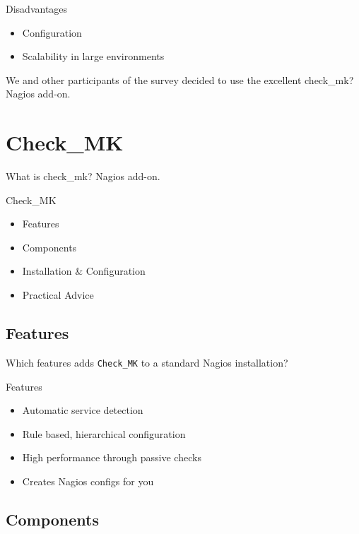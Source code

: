\begin{frame}{Disadvantages}

\begin{itemize}
\item Configuration
\item Scalability in large environments
\end{itemize}
\end{frame}

We and other participants of the survey decided to use the excellent 
check\_mk? Nagios add-on.

\section{Check\_MK}

What is check\_mk? Nagios add-on.

\begin{frame}[fragile]{Check\_MK}
\begin{itemize}
\item Features
\item Components
\item Installation \& Configuration
\item Practical Advice
\end{itemize}
\end{frame}

\subsection{Features}

Which features adds \verb|Check_MK| to a standard Nagios installation?

\begin{frame}[fragile]{Features}
\begin{itemize}
\item Automatic service detection
\item Rule based, hierarchical configuration
\item High performance through passive checks
\item Creates Nagios configs for you
\end{itemize}
\end{frame}

\subsection{Components}

